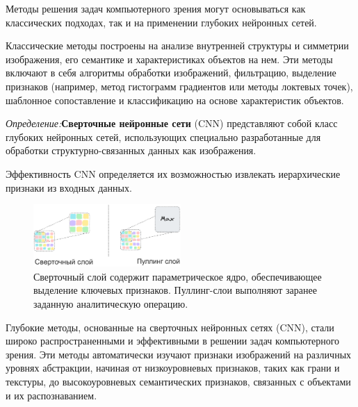 
Методы решения задач компьютерного зрения могут основываться как классических подходах, так и на применении глубоких нейронных сетей.

Классические методы построены на анализе внутренней структуры и симметрии изображения, его семантике и характеристиках объектов на нем. 
Эти методы включают в себя алгоритмы обработки изображений, фильтрацию, выделение признаков (например, метод гистограмм градиентов или методы локтевых точек),
шаблонное сопоставление и классификацию на основе характеристик объектов.

\textit{Определение:}\textbf{Сверточные нейронные сети} (CNN)\cite{lecun1989handwritten} представляют собой класс глубоких нейронных сетей,
использующих специально разработанные для обработки структурно-связанных данных как изображения. 

Эффективность CNN определяется их возможностью  извлекать иерархические признаки из входных данных.

\begin{figure}[h]
    \centering
    \includegraphics[width=0.5\textwidth]{assets/ml/cv/conv.excalidraw.png}
    \caption{Сверточный слой содержит параметрическое ядро, обеспечивающее выделение ключевых признаков. Пуллинг-слои выполняют заранее заданную аналитическую операцию.}
    \label{cnn}
\end{figure}

Глубокие методы, основанные на сверточных нейронных сетях (CNN), 
стали широко распространенными и эффективными в решении задач компьютерного зрения. 
Эти методы автоматически изучают признаки изображений на различных уровнях абстракции, 
начиная от низкоуровневых признаков, таких как грани и текстуры, до высокоуровневых семантических признаков,
связанных с объектами и их распознаванием. 
 
